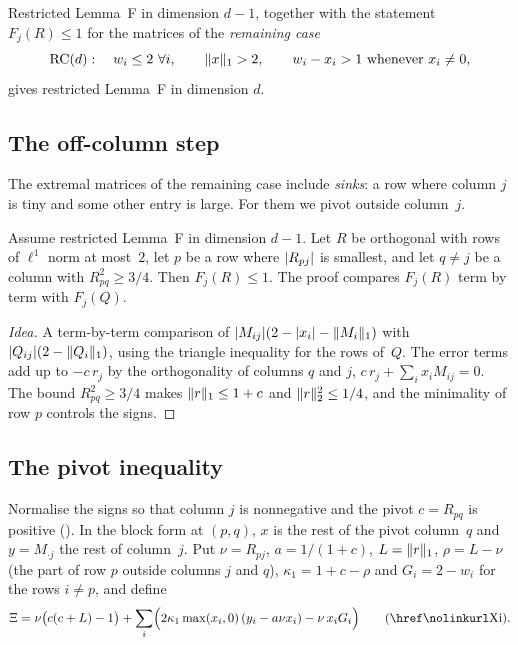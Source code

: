 \documentclass[11pt,a4paper]{article}
\newcommand{\status}[1]{\textsf{\small[#1]}}
\begin{document}
\begin{theorem}[induction step; \status{Lean}]\label{thm:succ}
Restricted Lemma~F in dimension $d-1$, together with the statement $F_j(R)\le1$ for the matrices of the \emph{remaining case}
\[
\mathrm{RC}(d):\quad w_i\le2\ \forall i,\qquad \lVert x\rVert_1>2,\qquad w_i-x_i>1\text{ whenever }x_i\ne0,
\]
gives restricted Lemma~F in dimension $d$.
\end{theorem}

\subsection{The off-column step}
The extremal matrices of the remaining case include \emph{sinks}: a row where column $j$ is tiny and some other entry is large. For them we pivot outside column~$j$.

\begin{theorem}[off-column step; \status{Lean}]\label{thm:offcol}
Assume restricted Lemma~F in dimension $d-1$. Let $R$ be orthogonal with rows of $\ell^1$ norm at most~$2$, let $p$ be a row where $\lvert R_{pj}\rvert$ is smallest, and let $q\ne j$ be a column with $R_{pq}^2\ge3/4$. Then $F_j(R)\le1$. The proof compares $F_j(R)$ term by term with $F_j(Q)$.
\end{theorem}
\begin{proof}[Idea]
A term-by-term comparison of $\lvert M_{ij}\rvert(2-\lvert x_i\rvert-\lVert M_i\rVert_1)$ with $\lvert Q_{ij}\rvert(2-\lVert Q_i\rVert_1)$, using the triangle inequality for the rows of~$Q$. The error terms add up to $-c\,r_j$ by the orthogonality of columns $q$ and $j$, $c\,r_j+\sum_ix_iM_{ij}=0$. The bound $R_{pq}^2\ge3/4$ makes $\lVert r\rVert_1\le 1+c$ and $\lVert r\rVert_2^2\le1/4$, and the minimality of row $p$ controls the signs.
\end{proof}

\subsection{The pivot inequality}
Normalise the signs so that column $j$ is nonnegative and the pivot $c=R_{pq}$ is positive (). In the block form at $(p,q)$, $x$ is the rest of the pivot column~$q$ and $y=M_{\cdot j}$ the rest of column~$j$. Put $\nu=R_{pj}$, $a=1/(1+c)$, $L=\lVert r\rVert_1$, $\rho=L-\nu$ (the part of row $p$ outside columns $j$ and $q$), $\kappa_1=1+c-\rho$ and $G_i=2-w_i$ for the rows $i\ne p$, and define
\[
\Xi=\nu\bigl(c(c+L)-1\bigr)+\sum_i\Bigl(2\kappa_1\max(x_i,0)\,(y_i-a\nu x_i)-\nu\,x_iG_i\Bigr)
\qquad\text{(\lean{PivotStep}{Xi})}.
\]
\end{document}
